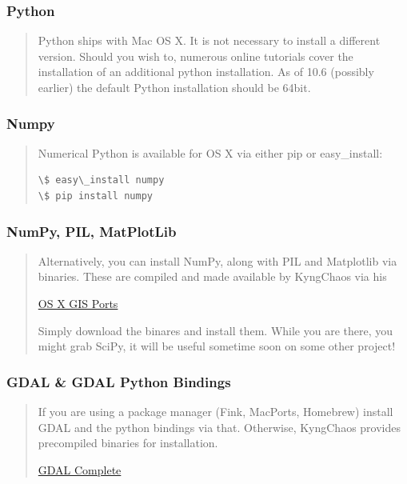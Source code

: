 \documentclass[letterpaper,10pt,english]{sphinxmanual}
\begin{document}
\subsubsection{Python}
\label{Installation:python}\begin{quote}

Python ships with Mac OS X.  It is not necessary to install a different version.  Should you wish to, numerous online tutorials cover the installation of an additional python installation.  As of 10.6 (possibly earlier) the default Python installation should be 64bit.
\end{quote}


\subsubsection{Numpy}
\label{Installation:id1}\begin{quote}

Numerical Python is available for OS X via either pip or easy\_install:

\begin{Verbatim}[commandchars=\\\{\}]
\$ easy\_install numpy
\$ pip install numpy
\end{Verbatim}
\end{quote}


\subsubsection{NumPy, PIL, MatPlotLib}
\label{Installation:numpy-pil-matplotlib}\begin{quote}

Alternatively, you can install NumPy, along with PIL and Matplotlib via binaries.  These are compiled and made available by KyngChaos via his

\href{http://www.kyngchaos.com/software/python}{OS X GIS Ports}

Simply download the binares and install them.  While you are there, you might grab SciPy, it will be useful sometime soon on some other project!
\end{quote}


\subsubsection{GDAL \& GDAL Python Bindings}
\label{Installation:gdal-gdal-python-bindings}\begin{quote}

If you are using a package manager (Fink, MacPorts, Homebrew) install GDAL and the python bindings via that.  Otherwise, KyngChaos provides precompiled binaries for installation.

\href{http://www.kyngchaos.com/software/frameworks}{GDAL Complete}
\end{quote}
\end{document}

